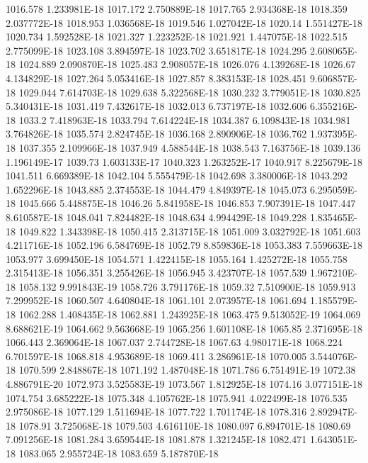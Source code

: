 1016.578  1.233981E-18
1017.172  2.750889E-18
1017.765  2.934368E-18
1018.359  2.037772E-18
1018.953  1.036568E-18
1019.546  1.027042E-18
1020.14  1.551427E-18
1020.734  1.592528E-18
1021.327  1.223252E-18
1021.921  1.447075E-18
1022.515  2.775099E-18
1023.108  3.894597E-18
1023.702  3.651817E-18
1024.295  2.608065E-18
1024.889  2.090870E-18
1025.483  2.908057E-18
1026.076  4.139268E-18
1026.67  4.134829E-18
1027.264  5.053416E-18
1027.857  8.383153E-18
1028.451  9.606857E-18
1029.044  7.614703E-18
1029.638  5.322568E-18
1030.232  3.779051E-18
1030.825  5.340431E-18
1031.419  7.432617E-18
1032.013  6.737197E-18
1032.606  6.355216E-18
1033.2  7.418963E-18
1033.794  7.614224E-18
1034.387  6.109843E-18
1034.981  3.764826E-18
1035.574  2.824745E-18
1036.168  2.890906E-18
1036.762  1.937395E-18
1037.355  2.109966E-18
1037.949  4.588544E-18
1038.543  7.163756E-18
1039.136  1.196149E-17
1039.73  1.603133E-17
1040.323  1.263252E-17
1040.917  8.225679E-18
1041.511  6.669389E-18
1042.104  5.555479E-18
1042.698  3.380006E-18
1043.292  1.652296E-18
1043.885  2.374553E-18
1044.479  4.849397E-18
1045.073  6.295059E-18
1045.666  5.448875E-18
1046.26  5.841958E-18
1046.853  7.907391E-18
1047.447  8.610587E-18
1048.041  7.824482E-18
1048.634  4.994429E-18
1049.228  1.835465E-18
1049.822  1.343398E-18
1050.415  2.313715E-18
1051.009  3.032792E-18
1051.603  4.211716E-18
1052.196  6.584769E-18
1052.79  8.859836E-18
1053.383  7.559663E-18
1053.977  3.699450E-18
1054.571  1.422415E-18
1055.164  1.425272E-18
1055.758  2.315413E-18
1056.351  3.255426E-18
1056.945  3.423707E-18
1057.539  1.967210E-18
1058.132  9.991843E-19
1058.726  3.791176E-18
1059.32  7.510900E-18
1059.913  7.299952E-18
1060.507  4.640804E-18
1061.101  2.073957E-18
1061.694  1.185579E-18
1062.288  1.408435E-18
1062.881  1.243925E-18
1063.475  9.513052E-19
1064.069  8.688621E-19
1064.662  9.563668E-19
1065.256  1.601108E-18
1065.85  2.371695E-18
1066.443  2.369064E-18
1067.037  2.744728E-18
1067.63  4.980171E-18
1068.224  6.701597E-18
1068.818  4.953689E-18
1069.411  3.286961E-18
1070.005  3.544076E-18
1070.599  2.848867E-18
1071.192  1.487048E-18
1071.786  6.751491E-19
1072.38  4.886791E-20
1072.973  3.525583E-19
1073.567  1.812925E-18
1074.16  3.077151E-18
1074.754  3.685222E-18
1075.348  4.105762E-18
1075.941  4.022499E-18
1076.535  2.975086E-18
1077.129  1.511694E-18
1077.722  1.701174E-18
1078.316  2.892947E-18
1078.91  3.725068E-18
1079.503  4.616110E-18
1080.097  6.894701E-18
1080.69  7.091256E-18
1081.284  3.659544E-18
1081.878  1.321245E-18
1082.471  1.643051E-18
1083.065  2.955724E-18
1083.659  5.187870E-18
